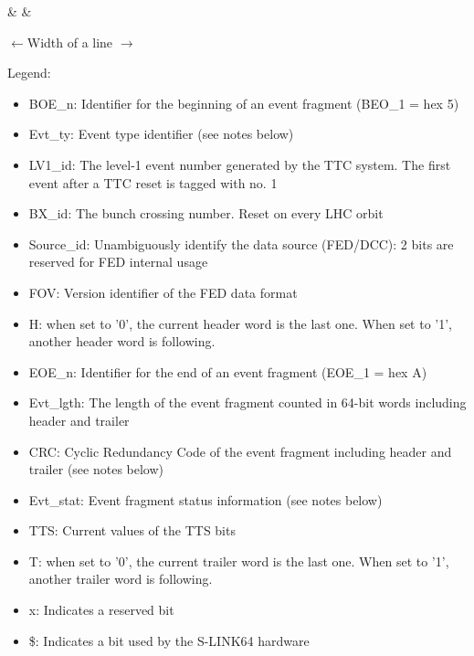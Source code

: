 \begin{landscape}
\begin{table}[htb]
  \caption{Example of a table for a 64-bit format}\label{tab:test2}
    \begin{bittabular}{64}
      & \bitNumEightByte
      & \bitNumEightByte
    \end{bittabular}
\end{table}

$\leftarrow$\hfill Width of a line \hfill$\rightarrow$

Legend: 
\begin{itemize}
\item BOE\_n: Identifier for the beginning of an event fragment (BEO\_1 = hex 5)
\item Evt\_ty: Event type identifier (see notes below)
\item LV1\_id: The level-1 event number generated by the TTC system. The first event after a TTC reset is tagged with no. 1
\item BX\_id: The bunch crossing number. Reset on every LHC orbit
\item Source\_id: Unambiguously identify the data source (FED/DCC): 2 bits are reserved for FED internal usage
\item FOV: Version identifier of the FED data format
\item H: when set to '0', the current header word is the last one. When set to '1', another header word is following.
\item EOE\_n: Identifier for the end of an event fragment (EOE\_1 = hex A)
\item Evt\_lgth: The length of the event fragment counted in 64-bit words including header and trailer
\item CRC: Cyclic Redundancy Code of the event fragment including header and trailer (see notes below)
\item Evt\_stat: Event fragment status information (see notes below)
\item TTS: Current values of the TTS bits
\item T: when set to '0', the current trailer word is the last one. When set to '1', another trailer word is following.
\item x: Indicates a reserved bit
\item \$: Indicates a bit used by the S-LINK64 hardware
\end{itemize}

\end{landscape}




